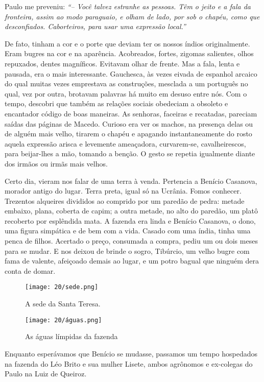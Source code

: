 Paulo me preveniu: 
\textit{``-- Você talvez estranhe as pessoas.
Têm o jeito e a fala da fronteira, assim ao modo paraguaio, e olham de lado, por sob o chapéu, como que desconfiados.
Caborteiros, para usar uma expressão local.'' }

De fato, tinham a cor e o porte que deviam ter os nossos índios originalmente.
Eram bugres na cor e na aparência.
Acobreados, fortes, zigomas salientes, olhos repuxados, dentes magníficos.
Evitavam olhar de frente.
Mas a fala, lenta e pausada, era o mais interessante.
Gauchesca, às vezes eivada de espanhol arcaico do qual muitas vezes emprestava as construções, mesclada a um português no qual, vez por outra, brotavam palavras há muito em desuso entre nós.
Com o tempo, descobri que também as relações sociais obedeciam a obsoleto e encantador código de boas maneiras.
As senhoras, faceiras e recatadas, pareciam saídas das páginas de Macedo.
Curioso era ver os machos, na presença delas ou de alguém mais velho, tirarem o chapéu e apagando instantaneamente do rosto aquela expressão arisca e levemente ameaçadora, curvarem-se, cavalheirescos, para beijar-lhes a mão, tomando a benção.
O gesto se repetia igualmente diante dos irmãos ou irmãs mais velhos.

Certo dia, vieram nos falar de uma terra à venda.
Pertencia a Benício Casanova, morador antigo do lugar.
Terra preta, igual só na Ucrânia.
Fomos conhecer.
Trezentos alqueires divididos ao comprido por um paredão de pedra: metade embaixo, plana, coberta de capim; a outra metade, no alto do paredão, um platô recoberto por esplêndida mata.
A fazenda era linda e Benício Casanova, o dono, uma figura simpática e de bem com a vida.
Casado com uma índia, tinha uma penca de filhos.
Acertado o preço, consumada a compra, pediu um ou dois meses para se mudar.
E nos deixou de brinde o sogro, Tibúrcio, um velho bugre com fama de valente, afeiçoado demais ao lugar, e um potro bagual que ninguém dera conta de domar.

\begin{figure}
\centering
\texttt{[image: 20/sede.png]}
\caption{A sede da Santa Teresa.}
\end{figure}

\begin{figure}
\centering
\texttt{[image: 20/águas.png]}
\caption{As águas límpidas da fazenda}
\end{figure}

Enquanto esperávamos que Benício se mudasse, passamos um tempo hospedados na fazenda do Léo Brito e sua mulher Lisete, ambos agrônomos e ex-colegas do Paulo na Luiz de Queiroz.
